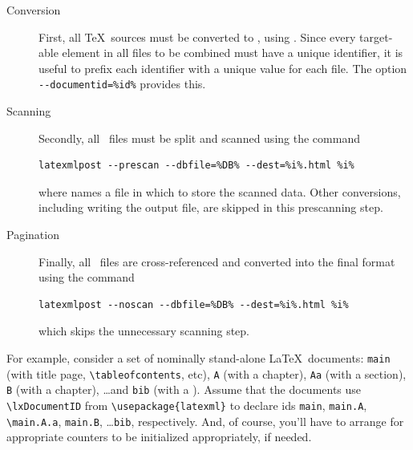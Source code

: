 \documentclass{book}
\newcommand{\shellcode}{\lstinline[style=shell]}
\begin{document}
\begin{description}
\item[Conversion] First, all \TeX\ sources must be converted
   to \XML, using .  Since every target-able element
   in all files to be combined must have a unique identifier, it is useful to
   prefix each identifier with a unique value for each file. 
   The  option \shellcode{--documentid=%

 \item[Scanning] Secondly, all \XML\ files must be split and scanned using
  the command
  \begin{lstlisting}[style=shell]
   latexmlpost --prescan --dbfile=%DB% --dest=%i%.html %i%
  \end{lstlisting}
  where  names a file in which to store the scanned data.
  Other conversions, including writing the output file, are skipped in this prescanning step.
 
 \item[Pagination] Finally, all \XML\ files are cross-referenced and converted into
   the final format using the command
   \begin{lstlisting}[style=shell]
     latexmlpost --noscan --dbfile=%DB% --dest=%i%.html %i%
   \end{lstlisting}
   which skips the unnecessary scanning step.
\end{description}

For example, consider a set of nominally stand-alone \LaTeX\ documents:
\texttt{main} (with title page, \verb|\tableofcontents|, etc),
\texttt{A} (with a chapter),
\texttt{Aa} (with a section),
\texttt{B} (with a chapter),
\ldots and \texttt{bib} (with a \verb||).
Assume that the documents use \verb|\lxDocumentID| from  \verb|\usepackage{latexml}|
to declare ids \verb|main|, \verb|main.A|, \verb|\main.A.a|, \verb|main.B|,
\ldots \verb|bib|, respectively.
And, of course, you'll have to arrange for appropriate counters to be initialized appropriately,
if needed.
\end{document}
